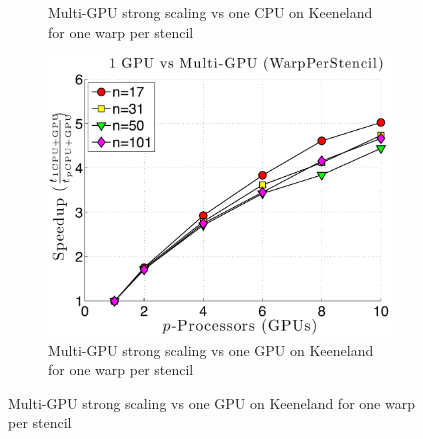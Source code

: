 \begin{figure}
\begin{subfigure}[t]{0.425\textwidth}
\caption{Multi-GPU strong scaling vs one CPU on Keeneland for one warp per stencil}
\label{fig:alltoall_multigpu_vs_cpu_scaling}
\end{subfigure} 
\begin{subfigure}[t]{0.425\textwidth}
\centering
\includegraphics[width=1.0\textwidth]{../figures/keeneland_results/alltoallv/speedup_1GPU_vs_NGPU_WarpPerStencil.pdf}
\caption{Multi-GPU strong scaling vs one GPU on Keeneland for one warp per stencil}
\label{fig:alltoall_multigpu_vs_gpu_scaling}
\end{subfigure} 
\end{figure}

